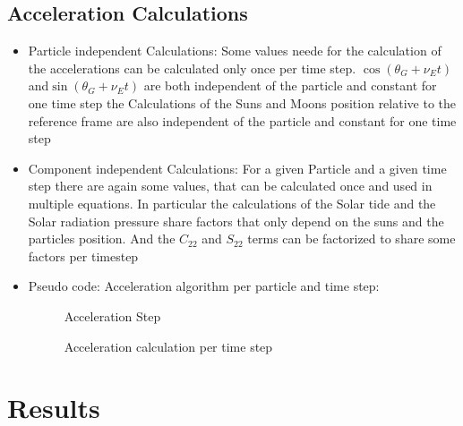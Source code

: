 \documentclass[11pt,
               a4paper,
               bibtotoc,
               idxtotoc,
               headsepline,
               footsepline,
               footexclude,
               BCOR12mm,
               DIV13,
               openany,   %
               ]
               {scrbook}
\begin{document}
\chapter{Acceleration Calculations}
    \begin{itemize}
        \item Particle independent Calculations:
        Some values neede for the calculation of the accelerations can be calculated only once per time step.
        \(\cos(\theta_G+\nu_Et)\) and\(\sin(\theta_G+\nu_Et)\) are both independent of the particle and constant for one time step
        the Calculations of the Suns and Moons position relative to the reference frame are also independent of the particle and constant for one time step
        \item Component independent Calculations:
        For a given Particle and a given time step there are again some values, that can be calculated once and used in multiple equations.
        In particular the calculations of the Solar tide and the Solar radiation pressure share factors that only depend on the suns and the particles position.
        And the \(C_{22}\) and \(S_{22}\) terms can be factorized to share some factors per timestep
        \item Pseudo code: Acceleration algorithm per particle and time step:
        \begin{figure}
            \begin{algorithm}[H]
            \caption[Acceleration Step]{Acceleration Step}
            \end{algorithm}
            \caption{Acceleration calculation per time step}
        \end{figure}
    \end{itemize}


\part{Results}
\end{document}
